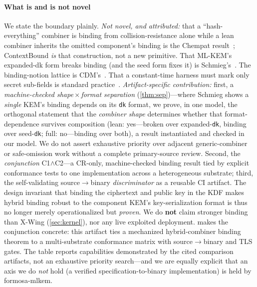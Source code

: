 \documentclass[journal]{IEEEtran}
\newcommand{\code}[1]{\texttt{\small #1}}
\begin{document}
\paragraph*{What is and is not novel}
We state the boundary plainly. \emph{Not novel, and attributed:} that a ``hash-everything''
combiner is binding from collision-resistance alone while a lean combiner inherits the omitted
component's binding is the Chempat result~\cite{chempat}; ContextBound \emph{is} that
construction, not a new primitive. That ML-KEM's expanded-dk form breaks binding (and the seed
form fixes it) is Schmieg's~\cite{schmieg}. The binding-notion lattice is
CDM's~\cite{cdm}. That a constant-time harness must mark only secret sub-fields is standard
practice~\cite{kyberslash}. \emph{Artifact-specific contribution:} first, a \emph{machine-checked
shape\,$\times$\,format separation} (\cref{thm:sep})---where Schmieg shows a \emph{single} KEM's
binding depends on its \code{dk} format, we prove, in one model, the orthogonal statement that the
\emph{combiner shape} determines whether that format-dependence survives composition (lean:
yes---broken over expanded-\code{dk}, binding over seed-\code{dk}; full: no---binding over both), a
result instantiated and checked in our model. We do not assert exhaustive priority over adjacent
generic-combiner or safe-omission work without a complete primary-source review. Second,
the \emph{conjunction} C1$\wedge$C2---a CR-only, machine-checked binding result tied by explicit
conformance tests to one implementation across a heterogeneous substrate; third, the self-validating
source$\to$binary \emph{discriminator} as a reusable CI artifact. The design invariant that binding
the ciphertext and public key in the KDF makes hybrid binding robust to the component KEM's
key-serialization format is thus no longer merely operationalized but \emph{proven}. We do \textbf{not} claim stronger binding than X-Wing
(\cref{sec:kernel}), nor any live exploited deployment.  makes the
conjunction concrete: this artifact ties a mechanized hybrid-combiner binding theorem to a
multi-substrate conformance matrix with source$\to$binary and TLS gates. The table reports
capabilities demonstrated by the cited comparison artifacts, not an exhaustive priority search---and
we are equally explicit that an axis we do \emph{not} hold (a verified specification-to-binary
implementation) is held by formosa-mlkem.
\end{document}
